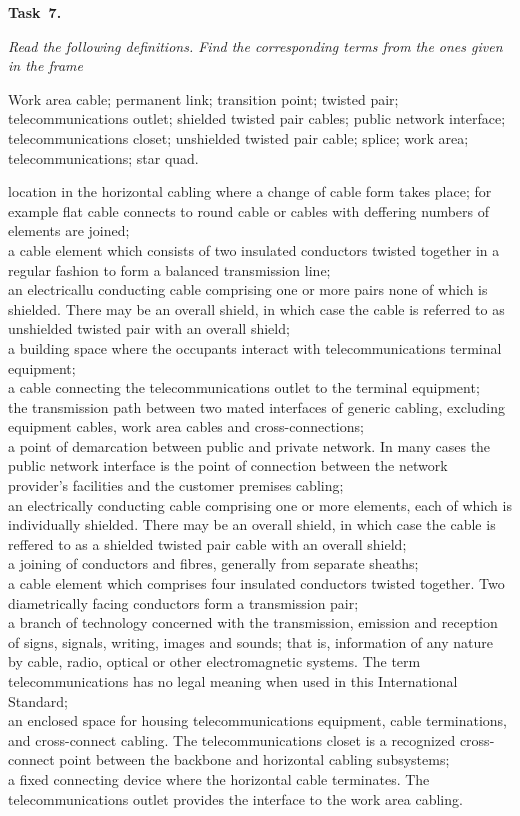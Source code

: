 {\bf Task~7.}~~{\it Read the following definitions. Find the corresponding terms from the ones given in the frame \par}
\begin{framed}
    Work area cable; permanent link; transition point; twisted pair; telecommunications outlet;
    shielded twisted pair cables; public network interface; telecommunications closet; unshielded
    twisted pair cable; splice; work area; telecommunications; star quad.
\end{framed}
location in the horizontal cabling where a change of cable form takes place; for example flat cable
connects to round cable or cables with deffering numbers of elements are joined;\\
a cable element which consists of two insulated conductors twisted together in a regular fashion to
form a balanced transmission line;\\
an electricallu conducting cable comprising one or more pairs none of which is shielded. There may
be an overall shield, in which case the cable is referred to as unshielded twisted pair with an overall shield;\\
a building space where the occupants interact with telecommunications terminal equipment;\\
a cable connecting the telecommunications outlet to the terminal equipment;\\
the transmission path between two mated interfaces of generic cabling, excluding equipment cables,
work area cables and cross-connections;\\
a point of demarcation between public and private network. In many cases the public network
interface is the point of connection between the network provider's facilities and the customer premises
cabling;\\
an electrically conducting cable comprising one or more elements, each of which is individually
shielded. There may be an overall shield, in which case the cable is reffered to as a shielded twisted
pair cable with an overall shield;\\
a joining of conductors and fibres, generally from separate sheaths;\\
a cable element which comprises four insulated conductors twisted together. Two diametrically
facing conductors form a transmission pair;\\
a branch of technology concerned with the transmission, emission and reception of signs, signals,
writing, images and sounds; that is, information of any nature by cable, radio, optical or other
electromagnetic systems. The term telecommunications has no legal meaning when used in this
International Standard;\\
an enclosed space for housing telecommunications equipment, cable terminations, and cross-connect cabling.
The telecommunications closet is a recognized cross-connect point between the backbone and horizontal
cabling subsystems;\\
a fixed connecting device where the horizontal cable terminates. The telecommunications outlet
provides the interface to the work area cabling.\par

